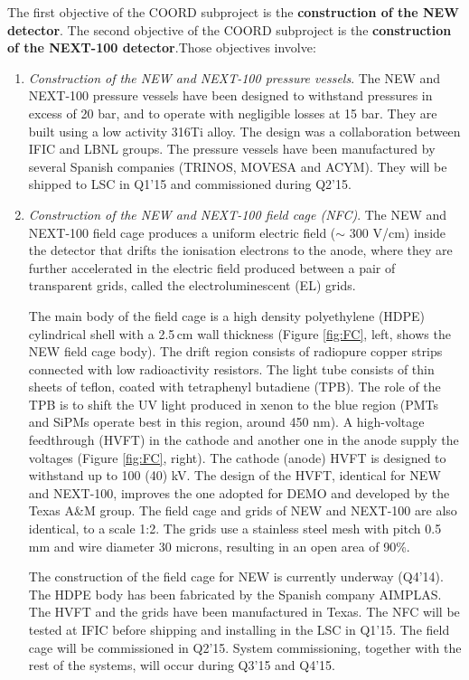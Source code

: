 The first objective of the COORD subproject is the {\bf construction of the NEW detector}. The second  objective of the COORD subproject is the {\bf construction of the NEXT-100 detector}.Those objectives involve:

\begin{enumerate}
\item {\em Construction of the NEW and NEXT-100 pressure vessels}.
The NEW and NEXT-100 pressure vessels have been designed to withstand pressures in excess of 20 bar, and to operate with negligible losses at 15 bar. They are built using a low activity 316Ti alloy. The design was a collaboration between IFIC and LBNL groups. The pressure vessels have been manufactured by several Spanish companies (TRINOS, MOVESA and ACYM). They will be shipped to LSC in Q1'15 and commissioned during Q2'15. 

\item {\em Construction of the NEW and NEXT-100 field cage (NFC)}.
The NEW and NEXT-100 field cage produces a uniform electric field ($\sim$ 300 V/cm) inside the  detector that drifts the ionisation electrons to the anode, where they are further accelerated in the electric field produced between a pair of transparent grids, called the electroluminescent (EL) grids. 

The main body of the field cage is a high density polyethylene (HDPE) cylindrical shell with a 2.5\,cm wall thickness (Figure \ref{fig:FC}, left, shows the NEW field cage body).  The drift region consists of radiopure  copper strips connected with low radioactivity resistors.  The light tube consists of thin sheets of teflon, coated with tetraphenyl butadiene (TPB). The role of the TPB is to shift the UV light produced in xenon to the blue region (PMTs and SiPMs operate best in this region, around 450 nm).  A high-voltage feedthrough (HVFT) in the cathode and another one in the anode supply the voltages (Figure \ref{fig:FC}, right). The cathode (anode) HVFT is designed to withstand up to 100 (40) kV. The design of the HVFT, identical for NEW and NEXT-100, improves the one adopted for DEMO and developed by the Texas A\&M group. The field cage and grids of NEW and NEXT-100 are also identical, to a scale 1:2. The grids use a stainless steel mesh with pitch 0.5 mm and wire diameter 30 microns, resulting in an open area of 90\%. 

The construction of the field cage for NEW is currently underway (Q4'14). The HDPE body has been fabricated by the Spanish company AIMPLAS. The HVFT and the grids have been manufactured in Texas. The NFC will be tested at IFIC before shipping and installing in the LSC in Q1'15. The field cage will be commissioned in Q2'15. System commissioning, together with the rest of the systems, will occur during Q3'15 and Q4'15.


\end{enumerate}
